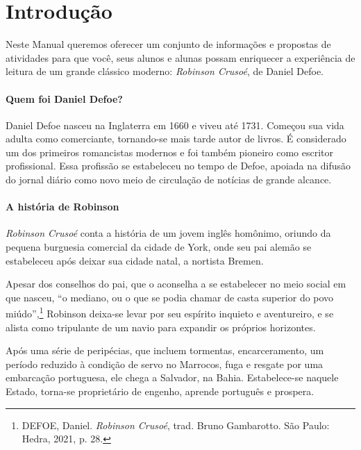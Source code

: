 \documentclass[12pt]{extarticle}
\begin{document}
\tableofcontents



\pagebreak\section{Introdução}

Neste Manual queremos oferecer um conjunto de informações e propostas de
atividades para que você, seus alunos e alunas possam enriquecer a
experiência de leitura de um grande clássico moderno: \emph{Robinson
Crusoé}, de Daniel Defoe.

\paragraph{Quem foi Daniel Defoe?}
Daniel Defoe nasceu na Inglaterra em 1660 e viveu até 1731. Começou sua
vida adulta como comerciante, tornando-se mais tarde autor de livros. É
considerado um dos primeiros romancistas modernos e foi também pioneiro
como escritor profissional. Essa profissão se estabeleceu no tempo de
Defoe, apoiada na difusão do jornal diário como novo meio de circulação
de notícias de grande alcance.


\paragraph{A história de Robinson}
\emph{Robinson Crusoé} conta a história de um jovem inglês homônimo,
oriundo da pequena burguesia comercial da cidade de York, onde seu pai
alemão se estabeleceu após deixar sua cidade natal, a nortista Bremen.

Apesar dos conselhos do pai, que o aconselha a se estabelecer no meio
social em que nasceu, ``o mediano, ou o que se podia chamar de casta
superior do povo miúdo'',\footnote{DEFOE, Daniel. \emph{Robinson
  Crusoé}, trad. Bruno Gambarotto. São Paulo: Hedra, 2021, p. 28.}
Robinson deixa-se levar por seu espírito inquieto e aventureiro, e se
alista como tripulante de um navio para expandir os próprios horizontes.

Após uma série de peripécias, que incluem tormentas, encarceramento, um
período reduzido à condição de servo no Marrocos, fuga e resgate por uma
embarcação portuguesa, ele chega a Salvador, na Bahia. Estabelece-se
naquele Estado, torna-se proprietário de engenho, aprende português e
prospera.
\end{document}
